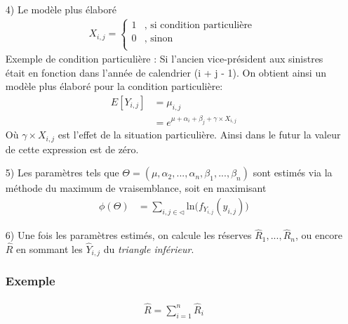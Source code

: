 \documentclass[11pt,french]{report}
\begin{document}
\begin{itemize}
\item[4)] Le modèle plus élaboré
\begin{align*}
	X_{i,j} =
     \left\{
     \begin{array}{rl}
      1 &, \text{ si condition particulière }  \\
      0 &, \text{ sinon} \\
     \end{array}
     \right.
\end{align*}
Exemple de condition particulière :
Si l'ancien vice-président aux sinistres était en fonction dans l'année de calendrier (i + j - 1).
On obtient ainsi un modèle plus élaboré pour la condition particulière:
\begin{align*}
E[Y_{i,j}] &= \mu_{i,j} \\
&= e^{\mu + \alpha_i+\beta_j + \gamma \times X_{i,j}}
\end{align*}
Où $\gamma \times X_{i,j}$ est l'effet de la situation particulière. Ainsi dans le futur la valeur de cette expression est de zéro.

\item[5)] Les paramètres tels que $\Theta = ( \mu, \alpha_2, ..., \alpha_n, \beta_1,..., \beta_n)$ sont estimés via la méthode du maximum de vraisemblance, soit en maximisant
\begin{align*}
\phi (\Theta) &= \sum_{i, j \in \triangleleft}^{} \text{ln} \big( f_{Y_{i, j}}(y_{i,j})\big)
\end{align*}

\item[6)] Une fois les paramètres estimés, on calcule les réserves $\widehat{R}_1, ..., \widehat{R}_n$, ou encore $\widehat{R}$ en sommant les $\widehat{Y}_{i,j}$ du \textit{triangle inférieur}.
\subsubsection*{Exemple}

\begin{align*}
\widehat{R}= \sum_{i=1}^{n} \widehat{R}_i
\end{align*}


\end{itemize}
\end{document}
